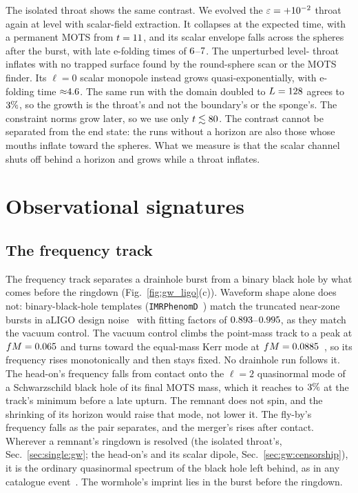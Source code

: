 \documentclass[twocolumn,floatfix,aps,prd,superscriptaddress,nofootinbib,showkeys]{revtex4-2}
\begin{document}
The isolated throat shows the same contrast. We evolved the $\varepsilon=+10^{-2}$ throat again at level \clmGwKickedLevel{} with scalar-field extraction. It collapses at the expected time, with a permanent MOTS from $t=11$, and its scalar envelope falls across the spheres after the burst, with late e-folding times of $6$--$7$. The unperturbed level-\clmGwSingleLevel{} throat inflates with no trapped surface found by the round-sphere scan or the MOTS finder. Its $\ell=0$ scalar monopole instead grows quasi-exponentially, with e-folding time ${\approx}4.6$. The same run with the domain doubled to $L=128$ agrees to $3\%$, so the growth is the throat's and not the boundary's or the sponge's. The constraint norms grow later, so we use only $t\lesssim80$. The contrast cannot be separated from the end state: the runs without a horizon are also those whose mouths inflate toward the spheres. What we measure is that the scalar channel shuts off behind a horizon and grows while a throat inflates.

\section{Observational signatures}
\label{sec:ligo}

\subsection{The frequency track}
\label{sec:ligo:ringdown}

The frequency track separates a drainhole burst from a binary black hole by what comes before the ringdown (Fig.~\ref{fig:gw_ligo}(c)). Waveform shape alone does not: binary-black-hole templates (\texttt{IMRPhenomD}~\cite{husa2016,khan2016}) match the truncated near-zone bursts in aLIGO design noise~\cite{aligo2010} with fitting factors of $0.893$--$0.995$, as they match the vacuum control. The vacuum control climbs the point-mass track to a peak at $fM=0.065$ and turns toward the equal-mass Kerr mode at $fM=0.0885$~\cite{berti2006,berti2009}, so its frequency rises monotonically and then stays fixed. No drainhole run follows it. The head-on's frequency falls from contact onto the $\ell=2$ quasinormal mode of a Schwarzschild black hole of its final MOTS mass, which it reaches to $3\%$ at the track's minimum before a late upturn. The remnant does not spin, and the shrinking of its horizon would raise that mode, not lower it. The fly-by's frequency falls as the pair separates, and the merger's rises after contact. Wherever a remnant's ringdown is resolved (the isolated throat's, Sec.~\ref{sec:single:gw}; the head-on's and its scalar dipole, Sec.~\ref{sec:gw:censorship}), it is the ordinary quasinormal spectrum of the black hole left behind, as in any catalogue event~\cite{gwtc3}. The wormhole's imprint lies in the burst before the ringdown.
\end{document}
